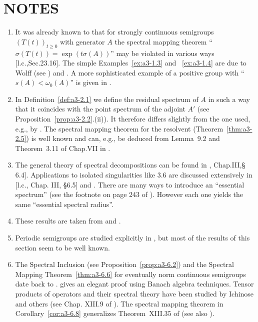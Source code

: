 \section*{NOTES}
\begin{enumerate}[label=\emph{Section \arabic*:}, wide]
\item 
It was already known to \citet{hillephillips:1957} that for strongly continuous semigroups $(T(t))_{t\geq 0}$ with generator $A$ the spectral mapping theorem \enquote{$\sigma(T(t)) = \exp(t\sigma(A))$} may be violated in various ways [l.c.,Sec.23.16].
The simple Examples~\ref{ex:a3-1.3} and ~\ref{ex:a3-1.4} are due to Wolff (see \citet{greinervoigtwolff:1981}) and \citet{zabczyk:1975}.
A more sophisticated example of a positive group with 
\enquote{$s(A) < \omega_{0}(A)$} is given in \citet{wolff:1981}.

\item 
In Definition~\ref{def:a3-2.1} we define the residual spectrum of $A$ in such a way that it coincides with the point spectrum of the adjoint $A'$ (see Proposition~\ref{prop:a3-2.2}.(ii)).
It therefore differs slightly from the one used, e.g., by \citet{schaefer:1974}.
The spectral mapping theorem for the resolvent (Theorem~\ref{thm:a3-2.5}) is well known and can, e.g., be deduced from Lemma~9.2 and Theorem~3.11 of Chap.VII in \citet{dunfordschwartz:1958}.

\item 
The general theory of spectral decompositions can be found in \citet{kato:1966}, Chap.III,§ 6.4].
Applications to isolated singularities like 3.6 are discussed extensively in [l.c., Chap. III, §6.5] and \citet[Chap.VIII, Sec.8]{yosida:1965}.
There are many ways to introduce an \enquote{essential spectrum} (see the footnote on page 243 of \citet{kato:1966}).
However each one yields the same \enquote{essential spectral radius}.

\item 
These results are taken from \citet{derndinger:1980} and \citet{greiner:1981}.

\item 
Periodic semigroups are studied explicitly in \citet{bart:1977}, but most of the results of this section seem to be well known.

\item
The Spectral Inclusion (see Proposition~\ref{prop:a3-6.2}) and the Spectral Mapping Theorem~\ref{thm:a3-6.6} for eventually norm continuous semigroups date back to \citet{hillephillips:1957}.
\citet{davies:1980} gives an elegant proof using Banach algebra techniques.
Tensor products of operators and their spectral theory have been studied by Ichinose and others (see Chap. XIII.9 of \citet{reedsimon:1978}).
The spectral mapping theorem in Corollary~\ref{cor:a3-6.8} generalizes Theorem~XIII.35 of \citet{reedsimon:1978} (see also \citet{herbst:1982}).


\end{enumerate}
